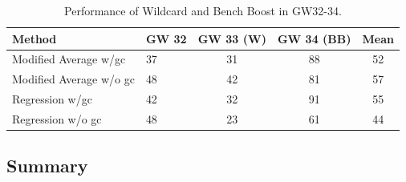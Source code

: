 \begin{table}[H]
\centering
\begin{tabular}{@{}llccc@{}}
\toprule
Method                  & GW 32 & GW 33 (W) & GW 34 (BB) & Mean \\ \midrule
Modified Average w/gc   & 37    & 31        & 88         & 52   \\
Modified Average w/o gc & 48    & 42        & 81         & 57   \\
Regression w/gc         & 42    & 32        & 91         & 55   \\
Regression w/o gc       & 48    & 23        & 61         & 44   \\ \bottomrule
\end{tabular}
\caption{Performance of Wildcard and Bench Boost in GW32-34.}
\label{tab:performance_wildcard_and_bench_boost}
\end{table}

\subsection{Summary}

